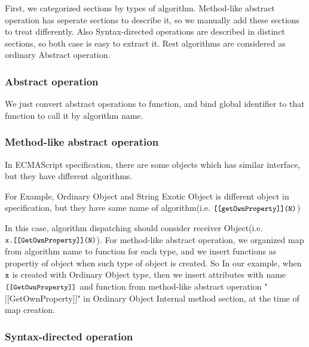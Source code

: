 First, we categorized sections by types of algorithm.
Method-like abstract operation has seperate sections to describe it, so we manually add these sections to treat differently.
Also Syntax-directed operations are described in distinct sections, so both case is easy to extract it.
Rest algorithms are considered as ordinary Abstract operation.

\subsubsection{Abstract operation}

We just convert abstract operations to function, and bind global identifier to that function to call it by algorithm name.

\subsubsection{Method-like abstract operation}

In ECMAScript specification, there are some objects which has similar interface, but they have different algorithms. 

For Example, Ordinary Object and String Exotic Object is different object in specification, but they have same name of algorithm(i.e. \( \texttt{\small[[getOwnProperty]](N)} \))

In this case, algorithm dispatching should consider receiver Object(i.e. \( \texttt{\small x.[[GetOwnProperty]](N)} \)).
For method-like abstract operation, we organized map from algorithm name to function for each type,
 and we insert functions as propertiy of object when such type of object is created. So In our example, when  \( \texttt{\small x} \) is created with Ordinary Object type,
 then we insert attributes with name \( \texttt{\small[[GetOwnProperty]]} \) and function from method-like abstract operation "[[GetOwnProperty]]" in Ordinary Object Internal method section, at the time of map creation.

 \subsubsection{Syntax-directed operation}
 
